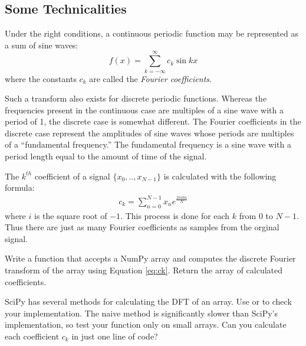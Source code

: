 \subsection*{Some Technicalities}
Under the right conditions, a continuous periodic function may be represented as a sum of sine waves:
\[
f(x) = \displaystyle{\sum_{k=-\infty}^{\infty}} c_k \sin{kx}
\]
where the constants $c_k$ are called the \emph{Fourier coefficients}.

Such a transform also exists for discrete periodic functions.
Whereas the frequencies present in the continuous case are multiples of a sine wave with a period of 1, the discrete case is somewhat different.
The Fourier coefficients in the discrete case represent the amplitudes of sine waves whose periods are multiples of a ``fundamental frequency.''
The fundamental frequency is a sine wave with a period length equal to the amount of time of the signal.

The $k^{th}$ coefficient of a signal $\{x_0, .., x_{N-1}\}$ is calculated with the following formula:
\begin{align}
c_k = \displaystyle{\sum_{n=0}^{N-1}} x_n e^{\frac{2\pi ikn}{N}}\label{eq:ck}
\end{align}
where $i$ is the square root of $-1$.
This process is done for each $k$ from $0$ to $N-1$.
Thus there are just as many Fourier coefficients as samples from the orginal signal.

\begin{problem}
Write a function that accepts a NumPy array and computes the discrete Fourier transform of the array using Equation \ref{eq:ck}.
Return the array of calculated coefficients.

SciPy has several methods for calculating the DFT of an array.
Use  or  to check your implementation.
The naive method is significantly slower than SciPy's implementation, so test your function only on small arrays.
Can you calculate each coefficient $c_k$ in just one line of code?
\end{problem}


